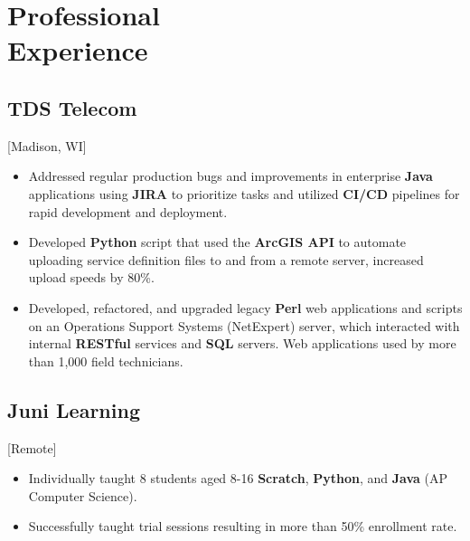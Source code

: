 \documentclass{mycv}
\begin{document}
\maketitle%

\section{Professional \\ Experience}
\subsection{TDS Telecom}[Madison, WI]
\begin{positions}
\end{positions}

\begin{itemize}
  \item {
  Addressed regular production bugs and improvements in enterprise \textbf{Java}
applications using \textbf{JIRA} to prioritize tasks and utilized \textbf{CI/CD} pipelines for
rapid development and deployment.
  }
  \item {
  Developed \textbf{Python} script that used the \textbf{ArcGIS API} to automate uploading
service definition files to and from a remote server, increased upload speeds
by 80\%.
}
  \item {
  Developed, refactored, and upgraded legacy \textbf{Perl} web applications and scripts
on an Operations Support Systems (NetExpert) server, which interacted with
internal \textbf{RESTful} services and \textbf{SQL} servers. Web applications used by more than 1,000
field technicians.
  }
\end{itemize}

\subsection{Juni Learning}[Remote]
\begin{positions}
\end{positions}

\begin{itemize}
  \item {
  Individually taught 8 students aged 8-16 \textbf{Scratch}, \textbf{Python}, and \textbf{Java} (AP Computer Science). 
  }
  \item{
  Successfully taught trial sessions resulting in more than 50\% enrollment rate.
  }
\end{itemize}
\end{document}
